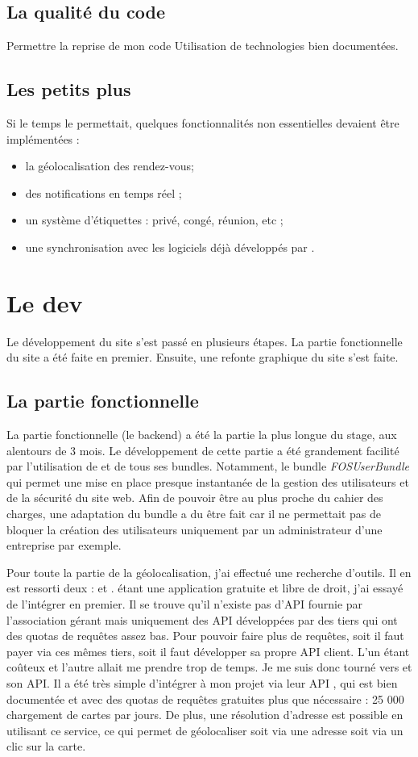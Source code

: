 \documentclass[a4paper, 11pt]{report}
\begin{document}
        \subsection{La qualité du code}
        Permettre la reprise de mon code
        Utilisation de technologies bien documentées.
    \subsection{Les petits plus}
    Si le temps le permettait, quelques fonctionnalités non essentielles devaient être implémentées :
    \begin{itemize}
        \item la géolocalisation des rendez-vous;
        \item des notifications en temps réel ;
        \item un système d'étiquettes : privé, congé, réunion, etc ;
        \item une synchronisation avec les logiciels déjà développés par \logilink.
    \end{itemize}

\section{Le dev}
Le développement du site \agenda s'est passé en plusieurs étapes. La partie fonctionnelle du site a été faite en premier. Ensuite, une refonte graphique du site s'est faite.
    \subsection{La partie fonctionnelle}
    La partie fonctionnelle (le backend) a été la partie la plus longue du stage, aux alentours de 3 mois. Le développement de cette partie a été grandement facilité par l'utilisation de \symfony et de tous ses bundles. Notamment, le bundle \textit{FOSUserBundle} qui permet une mise en place presque instantanée de la gestion des utilisateurs et de la sécurité du site web. Afin de pouvoir être au plus proche du cahier des charges, une adaptation du bundle a du être fait car il ne permettait pas de bloquer la création des utilisateurs uniquement par un administrateur d'une entreprise par exemple.

    Pour toute la partie de la géolocalisation, j'ai effectué une recherche d'outils. Il en est ressorti deux : \osm et \gmap. \osm étant une application gratuite et libre de droit, j'ai essayé de l'intégrer en premier. Il se trouve qu'il n'existe pas d'API fournie par l'association gérant \osm mais uniquement des API développées par des tiers qui ont des quotas de requêtes assez bas. Pour pouvoir faire plus de requêtes, soit il faut payer via ces mêmes tiers, soit il faut développer sa propre API client. L'un étant coûteux et l'autre allait me prendre trop de temps. Je me suis donc tourné vers \gmap et son API. Il a été très simple d'intégrer \gmap à mon projet via leur API \javascript, qui est bien documentée et avec des quotas de requêtes gratuites plus que nécessaire : 25 000 chargement de cartes par jours. De plus, une résolution d'adresse est possible en utilisant ce service, ce qui permet de géolocaliser soit via une adresse soit via un clic sur la carte.
\end{document}
